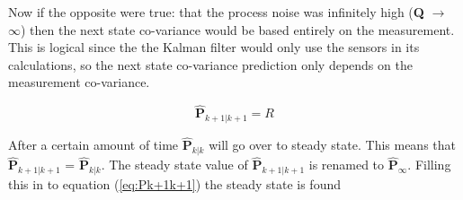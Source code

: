 Now if the opposite were true: that the process noise was infinitely high (\textbf{Q} $\rightarrow$ $\infty$) then the next state co-variance would be based entirely on the measurement. This is logical since the the Kalman filter would only use the sensors in its calculations, so the next state co-variance prediction only depends on the measurement co-variance.

\begin{equation}
    \hat{\textbf{P}}_{k+1|k+1} = R
\end{equation}

After a certain amount of time $\hat{\textbf{P}}_{k|k}$ will go over to steady state. This means that $\hat{\textbf{P}}_{k+1|k+1}$ = $\hat{\textbf{P}}_{k|k}$. The steady state value of $\hat{\textbf{P}}_{k+1|k+1}$ is renamed to $\hat{\textbf{P}}_{\infty}$. Filling this in to equation (\ref{eq:Pk+1k+1}) the steady state is found

